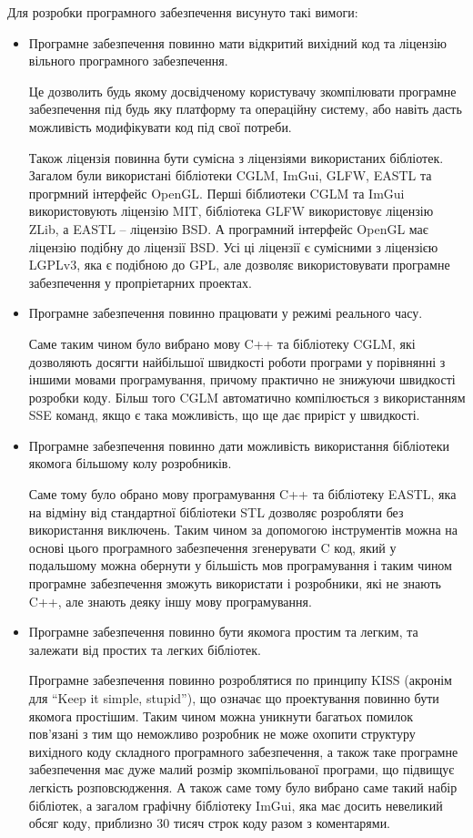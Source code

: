 \let\mypdfximage\pdfximage\def\pdfximage{\immediate\mypdfximage}\documentclass[14pt,a4paper]{extarticle}
\theoremstyle{definition}
\renewcommand{\[}{\begin{singlespace}\begin{equation*}}
\renewcommand{\]}{\end{equation*}\end{singlespace}}
\renewcommand{\+}{\discretionary{\mbox{\scriptsize$\hookleftarrow$}}{}{}}
\begin{document}
Для розробки програмного забезпечення висунуто такі вимоги:
\begin{itemize}
\item Програмне забезпечення повинно мати відкритий вихідний код та ліцензію вільного програмного забезпечення.

Це дозволить будь якому досвідченому користувачу зкомпілювати програмне забезпечення під будь яку платформу та операційну систему, або навіть дасть можливість модифікувати код під свої потреби.

Також ліцензія повинна бути сумісна з ліцензіями використаних бібліотек. Загалом були використані бібліотеки CGLM, ImGui, GLFW, EASTL та прогрмний інтерфейс OpenGL. Перші біблиотеки CGLM та ImGui використовують ліцензію MIT, бібліотека GLFW використовує ліцензію ZLib, а EASTL -- ліцензію BSD. А програмний інтерфейс OpenGL має ліцензію подібну до ліцензії BSD. Усі ці ліцензії є сумісними з ліцензією LGPLv3, яка є подібною до GPL, але дозволяє використовувати програмне забезпечення у пропріетарних проектах.

\item Програмне забезпечення повинно працювати у режимі реального часу.

Саме таким чином було вибрано мову C++ та бібліотеку CGLM, які дозволяють досягти найбільшої швидкості роботи програми у порівнянні з іншими мовами програмування, причому практично не знижуючи швидкості розробки коду. Більш того CGLM автоматично компілюється з використанням SSE команд, якщо є така можливість, що ще дає приріст у швидкості.

\item Програмне забезпечення повинно дати можливість використання бібліотеки якомога більшому колу розробників.

Саме тому було обрано мову програмування C++ та бібліотеку EASTL, яка на відміну від стандартної бібліотеки STL дозволяє розробляти без використання виключень. Таким чином за допомогою інструментів можна на основі цього програмного забезпечення згенерувати C код, який у подальшому можна обернути у більшість мов програмування і таким чином програмне забезпечення зможуть використати і розробники, які не знають C++, але знають деяку іншу мову програмування.

\item Програмне забезпечення повинно бути якомога простим та легким, та залежати від простих та легких бібліотек.

Програмне забезпечення повинно розроблятися по принципу KISS (акронім для ``Keep it simple, stupid''), що означає що проектування повинно бути якомога простішим. Таким чином можна уникнути багатьох помилок пов'язані з тим що неможливо розробник не може охопити структуру вихідного коду складного програмного забезпечення, а також таке програмне забезпечення має дуже малий розмір зкомпільованої програми, що підвищує легкість розповсюдження.  А також саме тому було вибрано саме такий набір бібліотек, а загалом графічну бібліотеку ImGui, яка має досить невеликий обсяг коду, приблизно 30 тисяч строк коду разом з коментарями.
\end{itemize}
\end{document}
